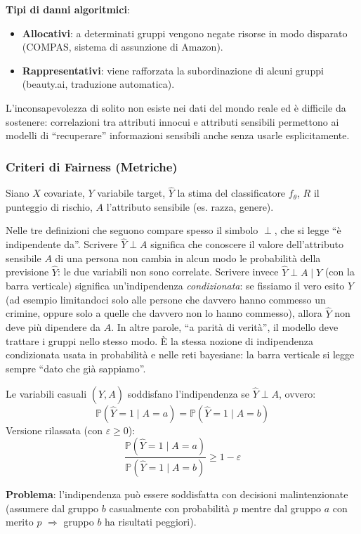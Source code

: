 \documentclass[a4paper,11pt]{article}
\begin{document}
\textbf{Tipi di danni algoritmici}:
\begin{itemize}
  \item \textbf{Allocativi}: a determinati gruppi vengono negate risorse in modo disparato (COMPAS, sistema di assunzione di Amazon).
  \item \textbf{Rappresentativi}: viene rafforzata la subordinazione di alcuni gruppi (beauty.ai, traduzione automatica).
\end{itemize}

\begin{definizione}
L'inconsapevolezza di solito non esiste nei dati del mondo reale ed \`{e} difficile da sostenere: correlazioni tra attributi innocui e attributi sensibili permettono ai modelli di ``recuperare'' informazioni sensibili anche senza usarle esplicitamente.
\end{definizione}

\subsubsection{Criteri di Fairness (Metriche)}

Siano $X$ covariate, $Y$ variabile target, $\hat{Y}$ la stima del classificatore $f_\theta$, $R$ il punteggio di rischio, $A$ l'attributo sensibile (es. razza, genere).

\begin{nota}
Nelle tre definizioni che seguono compare spesso il simbolo $\perp$, che si legge ``è indipendente da''. Scrivere $\hat{Y} \perp A$ significa che conoscere il valore dell'attributo sensibile $A$ di una persona non cambia in alcun modo le probabilità della previsione $\hat{Y}$: le due variabili non sono correlate. Scrivere invece $\hat{Y} \perp A \mid Y$ (con la barra verticale) significa un'indipendenza \emph{condizionata}: se fissiamo il vero esito $Y$ (ad esempio limitandoci solo alle persone che davvero hanno commesso un crimine, oppure solo a quelle che davvero non lo hanno commesso), allora $\hat{Y}$ non deve più dipendere da $A$. In altre parole, ``a parità di verità'', il modello deve trattare i gruppi nello stesso modo. È la stessa nozione di indipendenza condizionata usata in probabilità e nelle reti bayesiane: la barra verticale si legge sempre ``dato che già sappiamo''.
\end{nota}

\begin{definizione}
Le variabili casuali $(\hat{Y}, A)$ soddisfano l'indipendenza se $\hat{Y} \perp A$, ovvero:
\[
\mathbb{P}(\hat{Y} = 1 \mid A = a) = \mathbb{P}(\hat{Y} = 1 \mid A = b)
\]
Versione rilassata (con $\varepsilon \geq 0$):
\[
\frac{\mathbb{P}(\hat{Y} = 1 \mid A = a)}{\mathbb{P}(\hat{Y} = 1 \mid A = b)} \geq 1 - \varepsilon
\]

\textbf{Problema}: l'indipendenza pu\`{o} essere soddisfatta con decisioni malintenzionate (assumere dal gruppo $b$ casualmente con probabilit\`{a} $p$ mentre dal gruppo $a$ con merito $p$ $\Rightarrow$ gruppo $b$ ha risultati peggiori).
\end{definizione}
\end{document}
